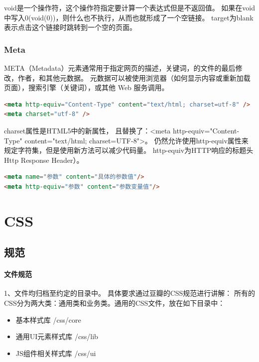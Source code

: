 \documentclass{book}
\begin{document}
void是一个操作符，这个操作符指定要计算一个表达式但是不返回值。
如果在void中写入0(void(0))，则什么也不执行，从而也就形成了一个空链接。
target为blank表示点击这个链接时跳转到一个空的页面。
\subsection{Meta}

META（Metadata）元素通常用于指定网页的描述，关键词，的文件的最后修改，作者，和其他元数据。
元数据可以被使用浏览器（如何显示内容或重新加载页面），搜索引擎（关键词），或其他 Web 服务调用。

\begin{lstlisting}[language=HTML]
<meta http-equiv="Content-Type" content="text/html; charset=utf-8" />
<meta charset="utf-8" />
\end{lstlisting}

charset属性是HTML5中的新属性，
且替换了：<meta http-equiv="Content-Type" content="text/html; charset=UTF-8">。
仍然允许使用http-equiv属性来规定字符集，但是使用新方法可以减少代码量。
http-equiv为HTTP响应的标题头Http Response Header）。

\begin{lstlisting}[language=HTML]
<meta name="参数" content="具体的参数值"/>
<meta http-equiv="参数" content="参数变量值"/>
\end{lstlisting}

\chapter{CSS}

\section{规范}

\subsubsection{文件规范}

1、文件均归档至约定的目录中。
具体要求通过豆瓣的CSS规范进行讲解：
所有的CSS分为两大类：通用类和业务类。通用的CSS文件，放在如下目录中：

\begin{itemize}
\item{基本样式库 /css/core}
\item{通用UI元素样式库 /css/lib}
\item{JS组件相关样式库 /css/ui}
\end{itemize}
\end{document}
